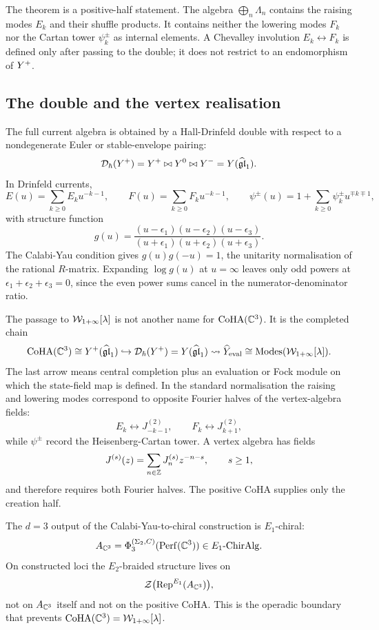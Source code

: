 The theorem is a positive-half statement.  The algebra
\(\bigoplus_n\Lambda_n\) contains the raising modes \(E_k\) and their
shuffle products.  It contains neither the lowering modes \(F_k\) nor
the Cartan tower \(\psi^\pm_k\) as internal elements.  A Chevalley
involution \(E_k\leftrightarrow F_k\) is defined only after passing to
the double; it does not restrict to an endomorphism of \(Y^{+}\).

\subsection*{The double and the vertex realisation}

The full current algebra is obtained by a Hall-Drinfeld double with
respect to a nondegenerate Euler or stable-envelope pairing:
\[
  \mathcal D_\hbar(Y^{+})
  =
  Y^{+}\bowtie Y^{0}\bowtie Y^{-}
  =
  Y(\widehat{\mathfrak{gl}}_1).
\]
In Drinfeld currents,
\[
 E(u)=\sum_{k\geq0}E_k u^{-k-1},\qquad
 F(u)=\sum_{k\geq0}F_k u^{-k-1},\qquad
 \psi^\pm(u)=1+\sum_{k\geq0}\psi^\pm_k u^{\mp k\mp1},
\]
with structure function
\[
  g(u)
  =
  \frac{(u-\epsilon_1)(u-\epsilon_2)(u-\epsilon_3)}
       {(u+\epsilon_1)(u+\epsilon_2)(u+\epsilon_3)}.
\]
The Calabi-Yau condition gives \(g(u)g(-u)=1\), the unitarity
normalisation of the rational \(R\)-matrix.  Expanding
\(\log g(u)\) at \(u=\infty\) leaves only odd powers at
\(\epsilon_1+\epsilon_2+\epsilon_3=0\), since the even power sums cancel
in the numerator-denominator ratio.

The passage to \(\mathcal{W}_{1+\infty}[\lambda]\) is not another name for
\(\mathrm{CoHA}(\mathbb{C}^3)\).  It is the completed chain
\[
\mathrm{CoHA}(\mathbb{C}^3)
\cong
Y^{+}(\widehat{\mathfrak{gl}}_1)
\hookrightarrow
\mathcal D_\hbar(Y^{+})
=
Y(\widehat{\mathfrak{gl}}_1)
\rightsquigarrow
\widehat{Y}_{\mathrm{eval}}
\cong
\operatorname{Modes}(\mathcal{W}_{1+\infty}[\lambda]).
\]
The last arrow means central completion plus an evaluation or Fock
module on which the state-field map is defined.  In the standard
normalisation the raising and lowering modes correspond to opposite
Fourier halves of the vertex-algebra fields:
\[
  E_k \leftrightarrow J^{(2)}_{-k-1},
  \qquad
  F_k \leftrightarrow J^{(2)}_{k+1},
\]
while \(\psi^\pm\) record the Heisenberg-Cartan tower.  A vertex
algebra has fields
\[
  J^{(s)}(z)=\sum_{n\in\mathbb{Z}}J^{(s)}_n z^{-n-s},
  \qquad s\geq1,
\]
and therefore requires both Fourier halves.  The positive CoHA supplies
only the creation half.

The \(d=3\) output of the Calabi-Yau-to-chiral construction is
\(E_1\)-chiral:
\[
  A_{\mathbb{C}^3}=\Phi_3^{(\Sigma_2,C)}(\mathrm{Perf}(\mathbb{C}^3))
  \in E_1\text{-}\mathrm{ChirAlg}.
\]
On constructed loci the \(E_2\)-braided structure lives on
\[
  \mathcal{Z}\bigl(\mathrm{Rep}^{E_1}(A_{\mathbb{C}^3})\bigr),
\]
not on \(A_{\mathbb{C}^3}\) itself and not on the positive CoHA\@.  This is the
operadic boundary that prevents
\(\mathrm{CoHA}(\mathbb{C}^3)=\mathcal{W}_{1+\infty}[\lambda]\).

